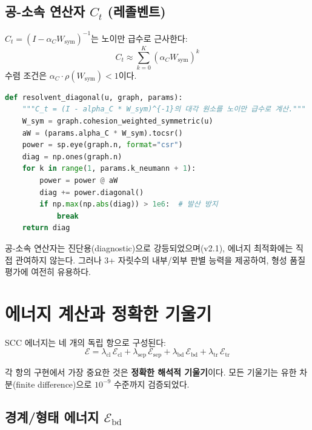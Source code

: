 \subsection{공-소속 연산자 $C_t$ (레졸벤트)}

$C_t = (I - \alpha_C W_{\mathrm{sym}})^{-1}$는 노이만 급수로 근사한다:
\begin{equation}
    C_t \approx \sum_{k=0}^{K} (\alpha_C W_{\mathrm{sym}})^k
\end{equation}
수렴 조건은 $\alpha_C \cdot \rho(W_{\mathrm{sym}}) < 1$이다.

\begin{lstlisting}[language=Python, caption={레졸벤트 대각 원소 계산 (operators.py)}]
def resolvent_diagonal(u, graph, params):
    """C_t = (I - alpha_C * W_sym)^{-1}의 대각 원소를 노이만 급수로 계산."""
    W_sym = graph.cohesion_weighted_symmetric(u)
    aW = (params.alpha_C * W_sym).tocsr()
    power = sp.eye(graph.n, format="csr")
    diag = np.ones(graph.n)
    for k in range(1, params.k_neumann + 1):
        power = power @ aW
        diag += power.diagonal()
        if np.max(np.abs(diag)) > 1e6:  # 발산 방지
            break
    return diag
\end{lstlisting}

공-소속 연산자는 진단용(diagnostic)으로 강등되었으며(v2.1), 에너지 최적화에는 직접 관여하지 않는다. 그러나 3+ 자릿수의 내부/외부 판별 능력을 제공하여, 형성 품질 평가에 여전히 유용하다.


\section{에너지 계산과 정확한 기울기}
\label{sec:energy-impl}

SCC 에너지는 네 개의 독립 항으로 구성된다:
\begin{equation}
    \mathcal{E} = \lambda_{\mathrm{cl}}\,\mathcal{E}_{\mathrm{cl}} + \lambda_{\mathrm{sep}}\,\mathcal{E}_{\mathrm{sep}} + \lambda_{\mathrm{bd}}\,\mathcal{E}_{\mathrm{bd}} + \lambda_{\mathrm{tr}}\,\mathcal{E}_{\mathrm{tr}}
    \label{eq:total-energy}
\end{equation}

각 항의 구현에서 가장 중요한 것은 \textbf{정확한 해석적 기울기}이다. 모든 기울기는 유한 차분(finite difference)으로 $10^{-9}$ 수준까지 검증되었다.

\subsection{경계/형태 에너지 $\mathcal{E}_{\mathrm{bd}}$}

